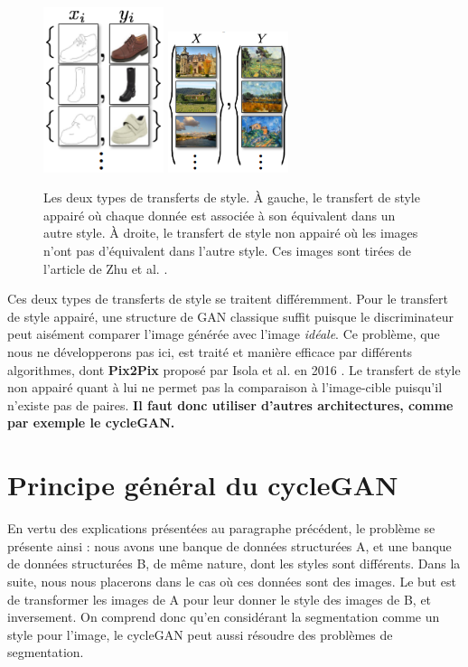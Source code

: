 \begin{figure}[!h]
\centering
\includegraphics[width=100pt,valign=t]{"images/paire"}
\hspace*{10mm}
\includegraphics[width=100pt,valign=t]{"images/pairepas"}
\caption{Les deux types de transferts de style. À gauche, le transfert de style appairé où chaque donnée est associée à son équivalent dans un autre style. À droite, le transfert de style non appairé où les images n'ont pas d'équivalent dans l'autre style. Ces images sont tirées de l'article de Zhu et al. \cite{zhu_unpaired_2018}.}
\label{paire}
\end{figure}

Ces deux types de transferts de style se traitent différemment. Pour le transfert de style appairé, une structure de GAN classique suffit puisque le discriminateur peut aisément comparer l'image générée avec l'image \textit{idéale}. Ce problème, que nous ne développerons pas ici, est traité et manière efficace par différents algorithmes, dont \textbf{Pix2Pix} proposé par Isola et al. en 2016 \cite{isola_image--image_2018}. Le transfert de style non appairé quant à lui ne permet pas la comparaison à l'image-cible puisqu'il n'existe pas de paires. \textbf{Il faut donc utiliser d'autres architectures, comme par exemple le cycleGAN.}


\section{Principe général du cycleGAN}

En vertu des explications présentées au paragraphe précédent, le problème se présente ainsi : nous avons une banque de données structurées A, et une banque de données structurées B, de même nature, dont les styles sont différents. Dans la suite, nous nous placerons dans le cas où ces données sont des images. Le but est de transformer les images de A pour leur donner le style des images de B, et inversement. On comprend donc qu'en considérant la segmentation comme un style pour l'image, le cycleGAN peut aussi résoudre des problèmes de segmentation.

